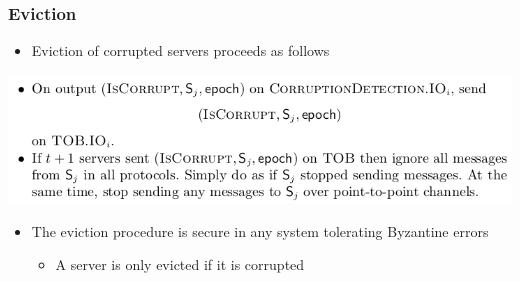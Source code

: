 \documentclass[11pt]{article}
\begin{document}
\subsubsection{Eviction}
\label{sec:orgff9d3ec}
\begin{itemize}
\item Eviction of corrupted servers proceeds as follows
\end{itemize}
\begin{center}
\includegraphics[width=.9\linewidth]{State Machine Replication (10)/screenshot_2018-10-21_16-52-52.png}
\end{center}

\begin{itemize}
\item The eviction procedure is secure in any system tolerating Byzantine errors
\begin{itemize}
\item A server is only evicted if it is corrupted
\end{itemize}
\end{itemize}
\end{document}
